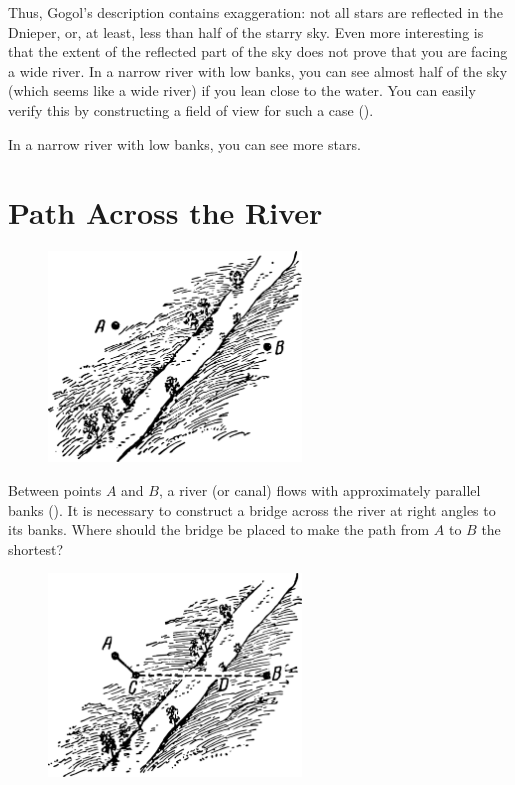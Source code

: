 Thus, Gogol's description contains exaggeration: not all stars are reflected in the Dnieper, or, at least, less than half of the starry sky. Even more interesting is that the extent of the reflected part of the sky does not prove that you are facing a wide river. In a narrow river with low banks, you can see almost half of the sky (which seems like a wide river) if you lean close to the water. You can easily verify this by constructing a field of view for such a case ().


In a narrow river with low banks, you can see more stars.

\clearpage

\section{Path Across the River}
\label{sec-2.17}


\begin{figure}[h!]
\centering
\includegraphics[width=0.6\textwidth]{figures/ch-02/fig-056.pdf}
\end{figure}

\ques Between points $A$ and $B$, a river (or canal) flows with approximately parallel banks (). It is necessary to construct a bridge across the river at right angles to its banks. Where should the bridge be placed to make the path from $A$ to $B$ the shortest?


\begin{figure}[h!]
\centering
\includegraphics[width=0.6\textwidth]{figures/ch-02/fig-057.pdf}
\end{figure}


